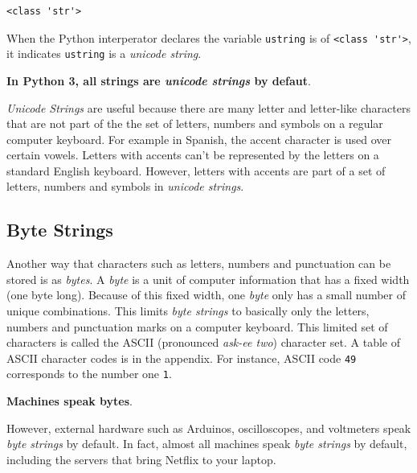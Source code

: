 \documentclass{book}
\begin{document}
    \begin{Verbatim}[commandchars=\\\{\}]
<class 'str'>

    \end{Verbatim}


    
        When the Python interperator declares the variable \lstinline!ustring!
is of \lstinline!<class 'str'>!, it indicates \lstinline!ustring! is a
\emph{unicode string}.

\textbf{In Python 3, all strings are \emph{unicode strings} by defaut}.

\emph{Unicode Strings} are useful because there are many letter and
letter-like characters that are not part of the the set of letters,
numbers and symbols on a regular computer keyboard. For example in
Spanish, the accent character is used over certain vowels. Letters with
accents can't be represented by the letters on a standard English
keyboard. However, letters with accents are part of a set of letters,
numbers and symbols in \emph{unicode strings}.
    




    
        \subsection{Byte Strings}\label{byte-strings}

Another way that characters such as letters, numbers and punctuation can
be stored is as \emph{bytes}. A \emph{byte} is a unit of computer
information that has a fixed width (one byte long). Because of this
fixed width, one \emph{byte} only has a small number of unique
combinations. This limits \emph{byte strings} to basically only the
letters, numbers and punctuation marks on a computer keyboard. This
limited set of characters is called the ASCII (pronounced \emph{ask-ee
two}) character set. A table of ASCII character codes is in the
appendix. For instance, ASCII code \lstinline!49! corresponds to the
number one \lstinline!1!.

\textbf{Machines speak bytes}.

However, external hardware such as Arduinos, oscilloscopes, and
voltmeters speak \emph{byte strings} by default. In fact, almost all
machines speak \emph{byte strings} by default, including the servers
that bring Netflix to your laptop.
    
\end{document}
